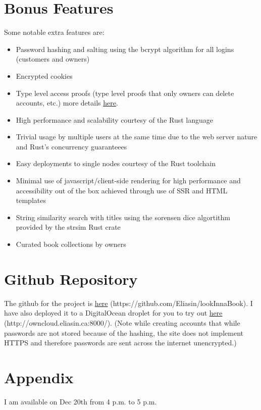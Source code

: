 \documentclass{article}
\begin{document}
\section{Bonus Features}
Some notable extra features are:
\begin{itemize}
  \item Password hashing and salting using the bcrypt algorithm for all logins (customers and owners)
  \item Encrypted cookies
  \item Type level access proofs (type level proofs that only owners can delete accounts, etc.) more details \href{https://rocket.rs/v0.4/guide/requests/#custom-guards}{here}.
  \item High performance and scalability courtesy of the Rust language
  \item Trivial usage by multiple users at the same time due to the web server nature and Rust's concurrency guaranteees
  \item Easy deployments to single nodes courtesy of the Rust toolchain
  \item Minimal use of javascript/client-side rendering for high performance and accessibility out of the box achieved through use of SSR and HTML templates
  \item String similarity search with titles using the sorensen dice algortithm provided by the strsim Rust crate
  \item Curated book collections by owners
\end{itemize}


\section{Github Repository}
The github for the project is \href{https://github.com/Eliasin/lookInnaBook}{here} (https://github.com/Eliasin/lookInnaBook). I have also deployed it to a DigitalOcean droplet for you to try out \href{http://owncloud.eliasin.ca:8000/}{here} (http://owncloud.eliasin.ca:8000/). (Note while creating accounts that while passwords are not stored because of the hashing, the site does not implement HTTPS and therefore passwords are sent across the internet unencrypted.)

\section{Appendix}
I am available on Dec 20th from 4 p.m. to 5 p.m.
\end{document}
